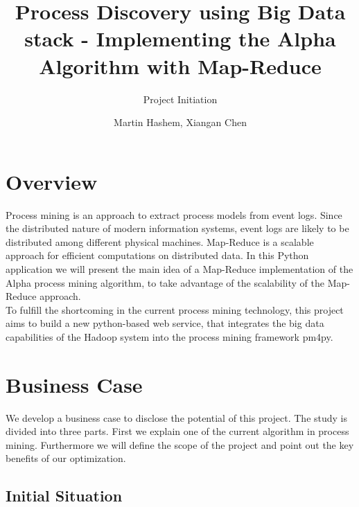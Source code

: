 \documentclass[runningheads]{llncs}
\begin{document}
%
\title{Process Discovery using Big Data stack - Implementing the Alpha Algorithm with Map-Reduce}
\subtitle{Project Initiation}
%
%

\author{Martin Hashem, Xiangan Chen}

%
\maketitle              %
%
%
%
%
\section{Overview}
Process mining is an approach to extract process models from event logs. Since the distributed nature of modern information systems, event logs are likely to be distributed among different physical machines. Map-Reduce is a scalable approach for efficient computations on distributed data. In this Python application we will present the main idea of a Map-Reduce implementation of the Alpha process mining algorithm, to take advantage of the scalability of the Map-Reduce approach.\\

\noindent
To fulfill the shortcoming in the current process mining technology, this project aims to build a new python-based web service, that integrates the big data capabilities of the Hadoop system into the process mining framework pm4py.
\section{Business Case}
We develop a business case to disclose the potential of this project. The study is divided into three parts. First we explain one of the current algorithm in process mining. Furthermore we will define the scope of the project and point out the key benefits of our optimization.
\subsection{Initial Situation}
\end{document}
